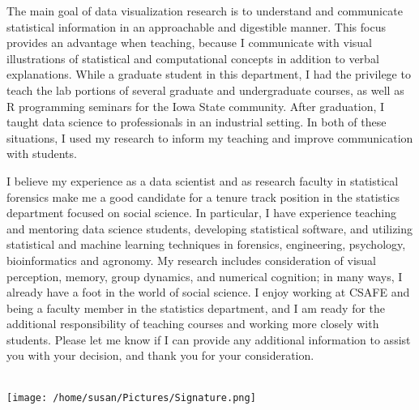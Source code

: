 \documentclass[12pt, letterpaper, sans]{moderncv}
\makeatletter
\renewcommand*{\makeletterclosing}{
  \vspace{1em}\@closing\\%
  \hspace{-1em}\texttt{[image: /home/susan/Pictures/Signature.png]}\\%
  {\bfseries \@firstname~\@lastname}%
  \ifthenelse{\isundefined{\@enclosure}}{}{%
    \\%
    \vfill%
    {\color{color2}\itshape\enclname: \@enclosure}}}
\makeatother
\begin{document}
The main goal of data visualization research is to understand and communicate statistical information in an approachable and digestible manner. This focus provides an advantage when teaching, because I communicate with visual illustrations of statistical and computational concepts in addition to verbal explanations. While a graduate student in this department, I had the privilege to teach the lab portions of several graduate and undergraduate courses, as well as R programming seminars for the Iowa State community. After graduation, I taught data science to professionals in an industrial setting. In both of these situations, I used my research to inform my teaching and improve communication with students. 

I believe my experience as a data scientist and as research faculty in statistical forensics make me a good candidate for a tenure track position in the statistics department focused on social science. In particular, I have experience teaching and mentoring data science students, developing statistical software, and utilizing statistical and machine learning techniques in forensics, engineering, psychology, bioinformatics and agronomy. My research includes consideration of visual perception, memory, group dynamics, and numerical cognition; in many ways, I already have a foot in the world of social science. I enjoy working at CSAFE and being a faculty member in the statistics department, and I am ready for the additional responsibility of teaching courses and working more closely with students. Please let me know if I can provide any additional information to assist you with your decision, and thank you for your consideration.  






\makeletterclosing
\end{document}
